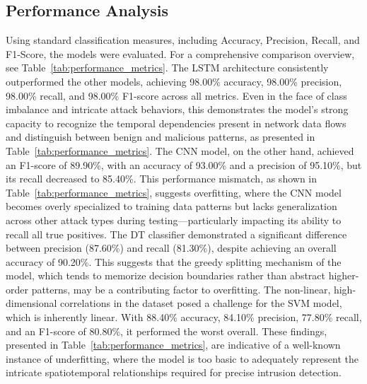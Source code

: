 \documentclass[conference]{IEEEtran}
\begin{document}
\subsection{Performance Analysis}
Using standard classification measures, including Accuracy, Precision, Recall, and F1-Score, the models were evaluated. For a comprehensive comparison overview, see Table~\ref{tab:performance_metrics}.
The LSTM architecture consistently outperformed the other models, achieving 98.00\% accuracy, 98.00\% precision, 98.00\% recall, and 98.00\% F1-score across all metrics. Even in the face of class imbalance and intricate attack behaviors, this demonstrates the model's strong capacity to recognize the temporal dependencies present in network data flows and distinguish between benign and malicious patterns, as presented in Table~\ref{tab:performance_metrics}.
The CNN model, on the other hand, achieved an F1-score of 89.90\%, with an accuracy of 93.00\% and a precision of 95.10\%, but its recall decreased to 85.40\%. This performance mismatch, as shown in Table~\ref{tab:performance_metrics}, suggests overfitting, where the CNN model becomes overly specialized to training data patterns but lacks generalization across other attack types during testing—particularly impacting its ability to recall all true positives.
The DT classifier demonstrated a significant difference between precision (87.60\%) and recall (81.30\%), despite achieving an overall accuracy of 90.20\%. This suggests that the greedy splitting mechanism of the model, which tends to memorize decision boundaries rather than abstract higher-order patterns, may be a contributing factor to overfitting. %
The non-linear, high-dimensional correlations in the dataset posed a challenge for the SVM model, which is inherently linear. With 88.40\% accuracy, 84.10\% precision, 77.80\% recall, and an F1-score of 80.80\%, it performed the worst overall. These findings, presented in Table~\ref{tab:performance_metrics}, are indicative of a well-known instance of underfitting, where the model is too basic to adequately represent the intricate spatiotemporal relationships required for precise intrusion detection.
\end{document}
